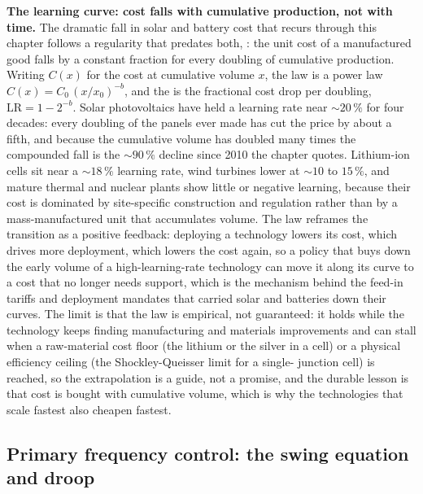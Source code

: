\begin{mastery}
\textbf{The learning curve: cost falls with cumulative production, not with
time.} The dramatic fall in solar and battery cost that recurs through this
chapter follows a regularity that predates both, : the
unit cost of a manufactured good falls by a constant fraction for every
doubling of cumulative production. Writing $C(x)$ for the cost at cumulative
volume $x$, the law is a power law $C(x) = C_0\,(x/x_0)^{-b}$, and the
 is the fractional cost drop per doubling, $\text{LR} =
1 - 2^{-b}$. Solar photovoltaics have held a learning rate near $\sim 20\,\%$
for four decades: every doubling of the panels ever made has cut the price by
about a fifth, and because the cumulative volume has doubled many times the
compounded fall is the $\sim 90\,\%$ decline since 2010 the chapter quotes.
Lithium-ion cells sit near a $\sim 18\,\%$ learning rate, wind turbines lower
at $\sim 10$ to $15\,\%$, and mature thermal and nuclear plants show little or
negative learning, because their cost is dominated by site-specific
construction and regulation rather than by a mass-manufactured unit that
accumulates volume. The law reframes the transition as a positive feedback:
deploying a technology lowers its cost, which drives more deployment, which
lowers the cost again, so a policy that buys down the early volume of a
high-learning-rate technology can move it along its curve to a cost that no
longer needs support, which is the mechanism behind the feed-in tariffs and
deployment mandates that carried solar and batteries down their curves.
The limit is that the law is empirical, not guaranteed: it holds while the
technology keeps finding manufacturing and materials improvements and can
stall when a raw-material cost floor (the lithium or the silver in a cell) or
a physical efficiency ceiling (the Shockley-Queisser limit for a single-
junction cell) is reached, so the extrapolation is a guide, not a promise, and
the durable lesson is that cost is bought with cumulative volume, which is why
the technologies that scale fastest also cheapen fastest.
\end{mastery}

\subsection{Primary frequency control: the swing equation and droop}

